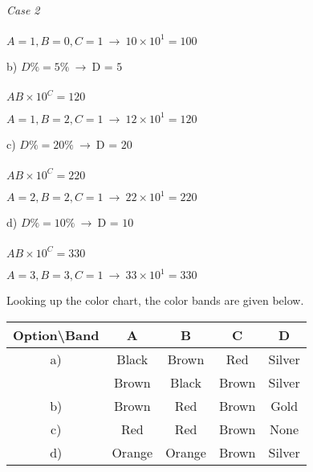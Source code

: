 \documentclass{article}
\begin{document}
{\vspace{4mm}}

{\Large \textit{Case 2} \\\\ $\boxed{A = 1, B = 0, C = 1} \ \rightarrow \ 10 \times 10^{1} = 100$}

{\vspace{8mm}}

{\Large b) $D\% = 5\% \ \rightarrow \ \boxed{\text{D = 5}}$ \\\\ $AB \times 10^{C} = 120$}

{\vspace{4mm}}

{\Large $\boxed{A = 1, B = 2, C = 1} \ \rightarrow \ 12 \times 10^{1} = 120$}

{\vspace{8mm}}

{\Large c) $D\% = 20\% \ \rightarrow \ \boxed{\text{D = 20}}$ \\\\ $AB \times 10^{C} = 220$}

{\vspace{4mm}}

{\Large $\boxed{A = 2, B = 2, C = 1} \ \rightarrow \ 22 \times 10^{1} = 220$}

{\vspace{8mm}}

{\Large d) $D\% = 10\% \ \rightarrow \ \boxed{\text{D = 10}}$ \\\\ $AB \times 10^{C} = 330$}

{\vspace{4mm}}

{\Large $\boxed{A = 3, B = 3, C = 1} \ \rightarrow \ 33 \times 10^{1} = 330$}

{\vspace{8mm}}

{\Large Looking up the color chart, the color bands are given below.}

\begin{center}
    \Large
    \begin{tabular}{ |c|c c c c| }
    \hline
        Option\textbackslash Band& A & B & C & D \\
        \hline
        a)& Black & Brown & Red & Silver\\
          & Brown & Black & Brown & Silver\\
        \hline
        b)& Brown & Red & Brown & Gold\\
        \hline
        c)& Red &Red & Brown & None\\ 
        \hline
        d)& Orange & Orange & Brown & Silver\\ 
        \hline
    \end{tabular}
\end{center}
\end{document}
